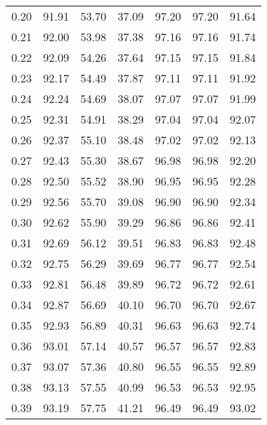 \begin{tabular}{|c|c|c|c|c|c|c|}
      0.20 &     91.91 &     53.70 &      37.09 &   97.20 &      97.20 &         91.64 \\
      0.21 &     92.00 &     53.98 &      37.38 &   97.16 &      97.16 &         91.74 \\
      0.22 &     92.09 &     54.26 &      37.64 &   97.15 &      97.15 &         91.84 \\
      0.23 &     92.17 &     54.49 &      37.87 &   97.11 &      97.11 &         91.92 \\
      0.24 &     92.24 &     54.69 &      38.07 &   97.07 &      97.07 &         91.99 \\
      0.25 &     92.31 &     54.91 &      38.29 &   97.04 &      97.04 &         92.07 \\
      0.26 &     92.37 &     55.10 &      38.48 &   97.02 &      97.02 &         92.13 \\
      0.27 &     92.43 &     55.30 &      38.67 &   96.98 &      96.98 &         92.20 \\
      0.28 &     92.50 &     55.52 &      38.90 &   96.95 &      96.95 &         92.28 \\
      0.29 &     92.56 &     55.70 &      39.08 &   96.90 &      96.90 &         92.34 \\
      0.30 &     92.62 &     55.90 &      39.29 &   96.86 &      96.86 &         92.41 \\
      0.31 &     92.69 &     56.12 &      39.51 &   96.83 &      96.83 &         92.48 \\
      0.32 &     92.75 &     56.29 &      39.69 &   96.77 &      96.77 &         92.54 \\
      0.33 &     92.81 &     56.48 &      39.89 &   96.72 &      96.72 &         92.61 \\
      0.34 &     92.87 &     56.69 &      40.10 &   96.70 &      96.70 &         92.67 \\
      0.35 &     92.93 &     56.89 &      40.31 &   96.63 &      96.63 &         92.74 \\
      0.36 &     93.01 &     57.14 &      40.57 &   96.57 &      96.57 &         92.83 \\
      0.37 &     93.07 &     57.36 &      40.80 &   96.55 &      96.55 &         92.89 \\
      0.38 &     93.13 &     57.55 &      40.99 &   96.53 &      96.53 &         92.95 \\
      0.39 &     93.19 &     57.75 &      41.21 &   96.49 &      96.49 &         93.02 \\

\end{tabular}
